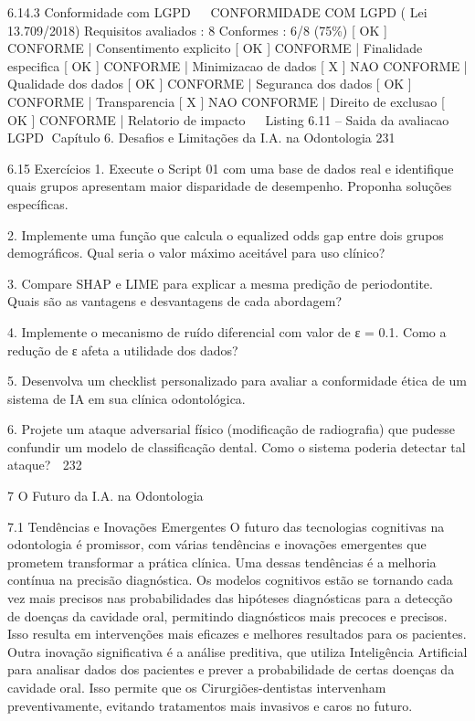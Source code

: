      6.14.3     Conformidade com LGPD
                                                                                                  
     CONFORMIDADE COM LGPD ( Lei 13.709/2018)
     Requisitos avaliados : 8
     Conformes : 6/8 (75\%)
       [ OK ] CONFORME | Consentimento explicito
       [ OK ] CONFORME | Finalidade especifica
       [ OK ] CONFORME | Minimizacao de dados
       [ X ] NAO CONFORME | Qualidade dos dados
       [ OK ] CONFORME | Seguranca dos dados
       [ OK ] CONFORME | Transparencia
       [ X ] NAO CONFORME | Direito de exclusao
       [ OK ] CONFORME | Relatorio de impacto
                                                                                                  
                               Listing 6.11 – Saida da avaliacao LGPD
Capítulo 6. Desafios e Limitações da I.A. na Odontologia                      231


6.15       Exercícios
  1. Execute o Script 01 com uma base de dados real e identifique quais grupos
     apresentam maior disparidade de desempenho. Proponha soluções específicas.

  2. Implemente uma função que calcula o equalized odds gap entre dois grupos
     demográficos. Qual seria o valor máximo aceitável para uso clínico?

  3. Compare SHAP e LIME para explicar a mesma predição de periodontite. Quais
     são as vantagens e desvantagens de cada abordagem?

  4. Implemente o mecanismo de ruído diferencial com valor de ε = 0.1. Como a
     redução de ε afeta a utilidade dos dados?

  5. Desenvolva um checklist personalizado para avaliar a conformidade ética de um
     sistema de IA em sua clínica odontológica.

  6. Projete um ataque adversarial físico (modificação de radiografia) que pudesse
     confundir um modelo de classificação dental. Como o sistema poderia detectar
     tal ataque?
                                                                                           232



7 O Futuro da I.A. na Odontologia

7.1     Tendências e Inovações Emergentes
O futuro das tecnologias cognitivas na odontologia é promissor, com várias tendências
e inovações emergentes que prometem transformar a prática clínica. Uma dessas
tendências é a melhoria contínua na precisão diagnóstica. Os modelos cognitivos estão
se tornando cada vez mais precisos nas probabilidades das hipóteses diagnósticas
para a detecção de doenças da cavidade oral, permitindo diagnósticos mais precoces
e precisos. Isso resulta em intervenções mais eficazes e melhores resultados para os
pacientes.
        Outra inovação significativa é a análise preditiva, que utiliza Inteligência Artificial
para analisar dados dos pacientes e prever a probabilidade de certas doenças da
cavidade oral. Isso permite que os Cirurgiões-dentistas intervenham preventivamente,
evitando tratamentos mais invasivos e caros no futuro.


